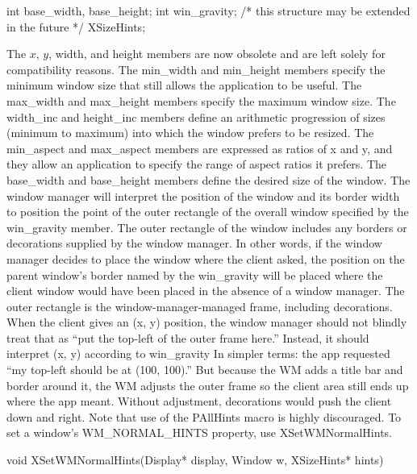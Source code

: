 \documentclass{report}
\begin{document}
\begin{itemize}
\begin{itemize}
\begin{cppcode}
{                    int base_width, base_height;
                    int win_gravity;
                    /* this structure may be extended in the future */
                } XSizeHints;
            \end{cppcode}
            \bigbreak \noindent 
            The $x$, $y$, width, and height members are now obsolete and are left solely for compatibility reasons. The min\_width and min\_height members specify the minimum window size that still allows the application to be useful. The max\_width and max\_height members specify the maximum window size. The width\_inc and height\_inc members define an arithmetic progression of sizes (minimum to maximum) into which the window prefers to be resized. The min\_aspect and max\_aspect members are expressed as ratios of x and y, and they allow an application to specify the range of aspect ratios it prefers. The base\_width and base\_height members define the desired size of the window. The window manager will interpret the position of the window and its border width to position the point of the outer rectangle of the overall window specified by the win\_gravity member. The outer rectangle of the window includes any borders or decorations supplied by the window manager. In other words, if the window manager decides to place the window where the client asked, the position on the parent window’s border named by the win\_gravity will be placed where the client window would have been placed in the absence of a window manager.
            \bigbreak \noindent 
            The outer rectangle is the window-manager-managed frame, including decorations.
            \bigbreak \noindent 
            When the client gives an (x, y) position, the window manager should not blindly treat that as “put the top-left of the outer frame here.” Instead, it should interpret (x, y) according to win\_gravity
            \bigbreak \noindent 
            In simpler terms: the app requested “my top-left should be at (100, 100).” But because the WM adds a title bar and border around it, the WM adjusts the outer frame so the client area still ends up where the app meant.
            \bigbreak \noindent 
            Without adjustment, decorations would push the client down and right.
            \bigbreak \noindent 
            Note that use of the PAllHints macro is highly discouraged. 
            \bigbreak \noindent 
            To set a window’s WM\_NORMAL\_HINTS property, use XSetWMNormalHints.
            \bigbreak \noindent 
            \begin{cppcode}
                void XSetWMNormalHints(Display* display, Window w, XSizeHints* hints)

\end{cppcode}
\end{itemize}
\end{itemize}
\end{document}
